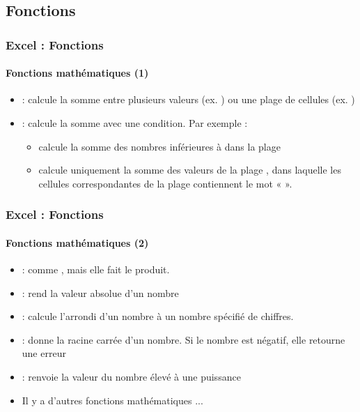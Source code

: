 \documentclass[xcolor=table, usenames,dvipsnames]{beamer}
\begin{document}
\subsection{Fonctions}

\begin{frame}
\frametitle{Excel : Fonctions}
\framesubtitle{Fonctions mathématiques (1)}
\begin{minipage}{0.81\textwidth}
\begin{itemize}
	\item {} : calcule la somme entre plusieurs valeurs (ex. ) ou une plage de cellules (ex. )
	\item {} : calcule la somme avec une condition. Par exemple : 
	\begin{itemize}
		\item {} calcule la somme des nombres inférieures à  dans la plage 
		\item {} calcule uniquement la somme des valeurs de la plage , dans laquelle les cellules correspondantes de la plage  contiennent le mot «  ».
	\end{itemize}
\end{itemize}
\end{minipage}
%
\begin{minipage}{0.18\textwidth}
	
\end{minipage}
\end{frame}

\begin{frame}
\frametitle{Excel : Fonctions}
\framesubtitle{Fonctions mathématiques (2)}
\begin{minipage}{0.81\textwidth}
	\begin{itemize}
		\item {} : comme , mais elle fait le produit.
		\item {} : rend la valeur absolue d'un nombre
		\item {} : calcule l'arrondi d'un nombre à un nombre spécifié de chiffres.
		\item {} : donne la racine carrée d'un nombre. Si le nombre est négatif, elle retourne une erreur 
		\item {} : renvoie la valeur du nombre élevé à une puissance
		\item Il y a d'autres fonctions mathématiques ...
	\end{itemize}
\end{minipage}
%
\begin{minipage}{0.18\textwidth}
	
\end{minipage}
\end{frame}
\end{document}
